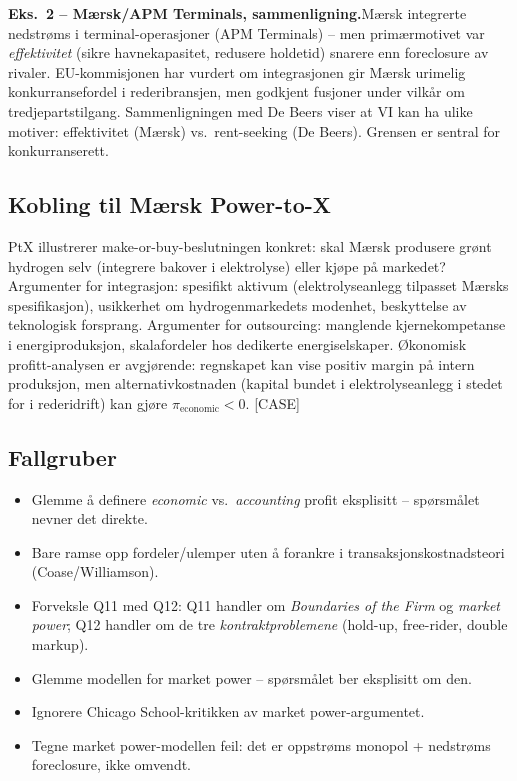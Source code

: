 \textbf{Eks.~2 -- Mærsk/APM Terminals, sammenligning.}
Mærsk integrerte nedstrøms i terminal-operasjoner (APM Terminals) -- men primærmotivet var \emph{effektivitet} (sikre havnekapasitet, redusere holdetid) snarere enn foreclosure av rivaler. EU-kommisjonen har vurdert om integrasjonen gir Mærsk urimelig konkurransefordel i rederibransjen, men godkjent fusjoner under vilkår om tredjepartstilgang. Sammenligningen med De Beers viser at VI kan ha ulike motiver: effektivitet (Mærsk) vs.\ rent-seeking (De Beers). Grensen er sentral for konkurranserett.

\subsection*{Kobling til Mærsk Power-to-X}
PtX illustrerer make-or-buy-beslutningen konkret: skal Mærsk produsere grønt hydrogen selv (integrere bakover i elektrolyse) eller kjøpe på markedet? Argumenter for integrasjon: spesifikt aktivum (elektrolyseanlegg tilpasset Mærsks spesifikasjon), usikkerhet om hydrogenmarkedets modenhet, beskyttelse av teknologisk forsprang. Argumenter for outsourcing: manglende kjernekompetanse i energiproduksjon, skalafordeler hos dedikerte energiselskaper. Økonomisk profitt-analysen er avgjørende: regnskapet kan vise positiv margin på intern produksjon, men alternativkostnaden (kapital bundet i elektrolyseanlegg i stedet for i rederidrift) kan gjøre $\pi_{\text{economic}}<0$. [CASE]

\subsection*{Fallgruber}
\begin{itemize}\setlength{\itemsep}{2pt}
\item Glemme å definere \emph{economic} vs.\ \emph{accounting} profit eksplisitt -- spørsmålet nevner det direkte.
\item Bare ramse opp fordeler/ulemper uten å forankre i transaksjonskostnadsteori (Coase/Williamson).
\item Forveksle Q11 med Q12: Q11 handler om \emph{Boundaries of the Firm} og \emph{market power}; Q12 handler om de tre \emph{kontraktproblemene} (hold-up, free-rider, double markup).
\item Glemme modellen for market power -- spørsmålet ber eksplisitt om den.
\item Ignorere Chicago School-kritikken av market power-argumentet.
\item Tegne market power-modellen feil: det er oppstrøms monopol + nedstrøms foreclosure, ikke omvendt.
\end{itemize}

